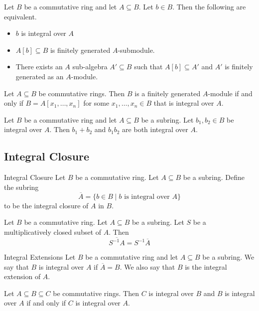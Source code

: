 \documentclass[a4paper]{article}
\begin{document}
\begin{prp}{}{} Let $B$ be a commutative ring and let $A\subseteq B$. Let $b\in B$. Then the following are equivalent. 
\begin{itemize}
\item $b$ is integral over $A$
\item $A[b]\subseteq B$ is finitely generated $A$-submodule. 
\item There exists an $A$ sub-algebra $A'\subseteq B$ such that $A[b]\subseteq A'$ and $A'$ is finitely generated as an $A$-module. 
\end{itemize}
\end{prp}

\begin{prp}{}{} Let $A\subseteq B$ be commutative rings. Then $B$ is a finitely generated $A$-module if and only if $B=A[x_1,\dots,x_n]$ for some $x_1,\dots,x_n\in B$ that is integral over $A$. 
\end{prp}

\begin{prp}{}{} Let $B$ be a commutative ring and let $A\subseteq B$ be a subring. Let $b_1,b_2\in B$ be integral over $A$. Then $b_1+b_2$ and $b_1b_2$ are both integral over $A$. 
\end{prp}

\subsection{Integral Closure}
\begin{defn}{Integral Closure}{} Let $B$ be a commutative ring. Let $A\subseteq B$ be a subring. Define the subring $$\overline{A}=\{b\in B\;|\;b\text{ is integral over }A\}$$ to be the integral closure of $A$ in $B$. 
\end{defn}

\begin{prp}{}{} Let $B$ be a commutative ring. Let $A\subseteq B$ be a subring. Let $S$ be a multiplicatively closed subset of $A$. Then $$\overline{S^{-1}A}=S^{-1}\overline{A}$$
\end{prp}

\begin{defn}{Integral Extensions}{} Let $B$ be a commutative ring and let $A\subseteq B$ be a subring. We say that $B$ is integral over $A$ if $\overline{A}=B$. We also say that $B$ is the integral extension of $A$. 
\end{defn}

\begin{lmm}{}{} Let $A\subseteq B\subseteq C$ be commutative rings. Then $C$ is integral over $B$ and $B$ is integral over $A$ if and only if $C$ is integral over $A$. 
\end{lmm}
\end{document}
